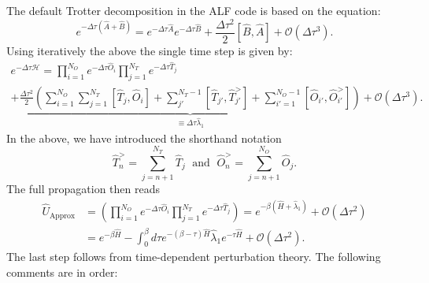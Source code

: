 The default Trotter decomposition in the ALF code is  based on the equation: 
\begin{equation}
	e^{ -\Delta \tau \left( \hat{A} + \hat{B} \right)  }  =  e^{ -\Delta \tau \hat{A}}  e^{ -\Delta \tau  \hat{B}  }   +  \frac{\Delta  \tau^2}{2} \left[ \hat{B}, \hat{A} \right] + \mathcal{O} \left (\Delta \tau ^3 \right).
\end{equation}
Using iteratively the above  the single time step is given by: 
\begin{multline}
    e^{-\Delta \tau \mathcal{H}}   =   \prod_{i=1}^{N_O} e^{-\Delta \tau \hat{O}_i} \prod_{j=1}^{N_T} e^{-\Delta \tau \hat{T}_j}   \\
    + \underbrace{ \frac{\Delta \tau^2}{2}  
   \left(    \sum_{i=1}^{N_O}  \sum_{j=1}^{N_T} \left[ \hat{T}_j, \hat{O}_i \right]  +   \sum_{j'}^{N_T -1}  \left[ \hat{T}_{j'},   \hat{T}_{j'}^{>}\right] 
   +   \sum_{i'=1}^{N_O-1}  \left[ \hat{O}_{i'}, \hat{O}^{>}_{i'} \right]  \right)  }_{\equiv \Delta \tau \hat{\lambda}_1} 
   + \mathcal{O} \left( \Delta \tau^3 \right).
\end{multline}
In the above, we have introduced the shorthand notation 
\begin{equation}
\hat{T}_{n}^{>} = \sum_{j=n+1}^{N_T}  \hat{T}_{j} \; \text{ and } \; \hat{O}_{n}^{>} = \sum_{j=n+1}^{N_O}  \hat{O}_{j}.
\end{equation} 
The full propagation then reads
\begin{equation}
\begin{split}
  \hat{U}_{\text{Approx}} &=  \left(\prod_{i=1}^{N_O} e^{-\Delta \tau \hat{O}_i} \prod_{j=1}^{N_T} e^{-\Delta \tau \hat{T}_j}  \right)   = e^{-\beta \left(  \hat{H} + \hat{\lambda}_1 \right)} 
  + \mathcal{O} \left( \Delta \tau^2 \right)  \\
  &=  e^{-\beta  \hat{H}  }  - 
	 \int_0^{\beta}  d \tau  e^{-(\beta-\tau )\hat{H}} \hat{\lambda}_1  e^{-\tau \hat{H}}   +  \mathcal{O} (\Delta \tau^2 ).
\end{split}
\end{equation} 
The last step follows from time-dependent perturbation theory. 
The following comments are in order:
